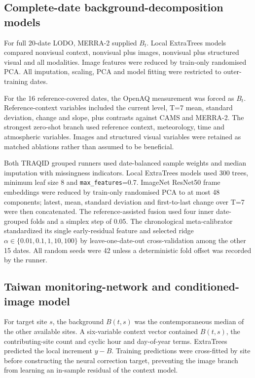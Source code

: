 \documentclass[review,12pt,authoryear]{elsarticle}
\begin{document}
\subsection{Complete-date background-decomposition models}

For full 20-date LODO, MERRA-2 supplied $B_t$. Local ExtraTrees models compared
nonvisual context, nonvisual plus images, nonvisual plus structured visual and
all modalities. Image features were reduced by train-only randomised PCA. All
imputation, scaling, PCA and model fitting were restricted to outer-training
dates.

For the 16 reference-covered dates, the OpenAQ measurement was forced as
$B_t$. Reference-context variables included the current level, T=7 mean,
standard deviation, change and slope, plus contrasts against CAMS and MERRA-2.
The strongest zero-shot branch used reference context, meteorology, time and
atmospheric variables. Images and structured visual variables were retained as
matched ablations rather than assumed to be beneficial.

Both TRAQID grouped runners used date-balanced sample weights and median
imputation with missingness indicators. Local ExtraTrees models used 300 trees,
minimum leaf size 8 and \texttt{max\_features}=0.7. ImageNet ResNet50 frame
embeddings were reduced by train-only randomised PCA to at most 48 components;
latest, mean, standard deviation and first-to-last change over T=7 were then
concatenated. The reference-assisted fusion used four inner date-grouped folds
and a simplex step of 0.05. The chronological meta-calibrator standardized its
single early-residual feature and selected ridge
$\alpha\in\{0.01,0.1,1,10,100\}$ by leave-one-date-out cross-validation among
the other 15 dates. All random seeds were 42 unless a deterministic fold offset
was recorded by the runner.

\subsection{Taiwan monitoring-network and conditioned-image model}

For target site $s$, the background $B(t,s)$ was the contemporaneous median of
the other available sites. A six-variable context vector contained $B(t,s)$,
the contributing-site count and cyclic hour and day-of-year terms. ExtraTrees
predicted the local increment $y-B$. Training predictions were cross-fitted by
site before constructing the neural correction target, preventing the image
branch from learning an in-sample residual of the context model.
\end{document}
